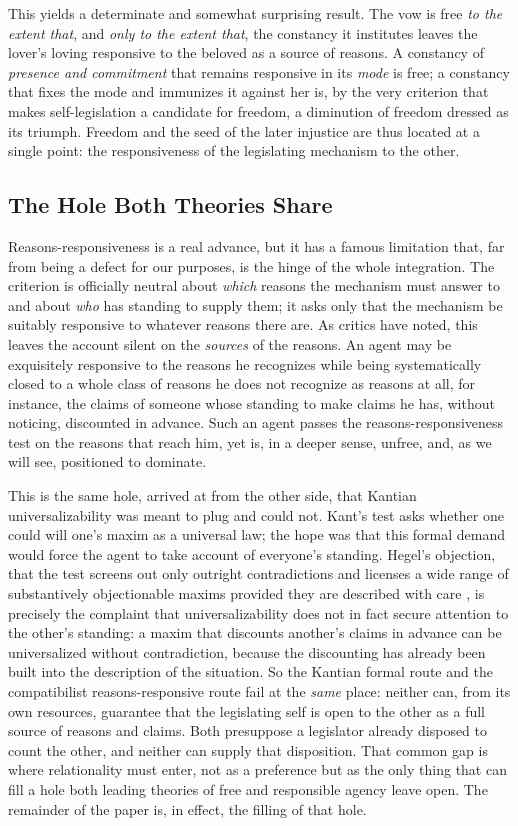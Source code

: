 This yields a determinate and somewhat surprising result. The vow is free \emph{to the extent that}, and \emph{only to the extent that}, the constancy it institutes leaves the lover's loving responsive to the beloved as a source of reasons. A constancy of \emph{presence and commitment} that remains responsive in its \emph{mode} is free; a constancy that fixes the mode and immunizes it against her is, by the very criterion that makes self-legislation a candidate for freedom, a diminution of freedom dressed as its triumph. Freedom and the seed of the later injustice are thus located at a single point: the responsiveness of the legislating mechanism to the other.

\subsection{The Hole Both Theories Share}

Reasons-responsiveness is a real advance, but it has a famous limitation that, far from being a defect for our purposes, is the hinge of the whole integration. The criterion is officially neutral about \emph{which} reasons the mechanism must answer to and about \emph{who} has standing to supply them; it asks only that the mechanism be suitably responsive to whatever reasons there are. As critics have noted, this leaves the account silent on the \emph{sources} of the reasons. An agent may be exquisitely responsive to the reasons he recognizes while being systematically closed to a whole class of reasons he does not recognize as reasons at all, for instance, the claims of someone whose standing to make claims he has, without noticing, discounted in advance. Such an agent passes the reasons-responsiveness test on the reasons that reach him, yet is, in a deeper sense, unfree, and, as we will see, positioned to dominate.

This is the same hole, arrived at from the other side, that Kantian universalizability was meant to plug and could not. Kant's test asks whether one could will one's maxim as a universal law; the hope was that this formal demand would force the agent to take account of everyone's standing. Hegel's objection, that the test screens out only outright contradictions and licenses a wide range of substantively objectionable maxims provided they are described with care \parencite[§135]{hegel1820right}, is precisely the complaint that universalizability does not in fact secure attention to the other's standing: a maxim that discounts another's claims in advance can be universalized without contradiction, because the discounting has already been built into the description of the situation. So the Kantian formal route and the compatibilist reasons-responsive route fail at the \emph{same} place: neither can, from its own resources, guarantee that the legislating self is open to the other as a full source of reasons and claims. Both presuppose a legislator already disposed to count the other, and neither can supply that disposition. That common gap is where relationality must enter, not as a preference but as the only thing that can fill a hole both leading theories of free and responsible agency leave open. The remainder of the paper is, in effect, the filling of that hole.

